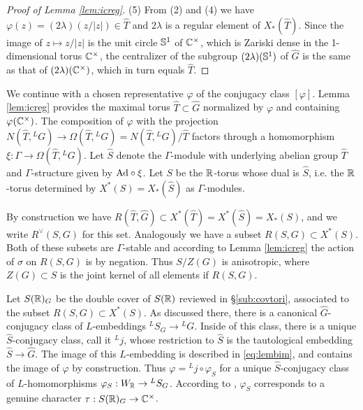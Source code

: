 \documentclass{article}
\theoremstyle{definition}
\numberwithin{equation}{section}
\renewcommand{\-}{\hyp{}}
\begin{document}
\begin{proof}[Proof of Lemma \ref{lem:icreg}]
(5) From (2) and (4) we have $\varphi(z)=(2\lambda)(z/|z|) \in \hat T$ and $2\lambda$ is a regular element of $X_*(\hat T)$. Since the image of $z \mapsto z/|z|$ is the unit circle $\mathbb{S}^1$ of $\mathbb{C}^\times$, which is Zariski dense in the 1-dimensional torus $\mathbb{C}^\times$, the centralizer of the subgroup $(2\lambda)(\mathbb{S}^1)$ of $\hat G$ is the same as that of $(2\lambda)(\mathbb{C}^\times)$, which in turn equals $\hat T$.
\end{proof}

We continue with a chosen representative $\varphi$ of the conjugacy class $[\varphi]$. Lemma \ref{lem:icreg} provides the maximal torus $\hat T \subset \hat G$ normalized by $\varphi$ and containing $\varphi(\mathbb{C}^\times)$.
%
%
The composition of $\varphi$ with the projection $N(\hat T,{^LG}) \to \Omega(\hat T,{^LG})=N(\hat T,{^LG})/\hat T$ factors through a homomorphism $\xi : \Gamma \to \Omega(\hat T,{^LG})$. Let $\hat S$ denote the $\Gamma$-module with underlying abelian group $\hat T$ and $\Gamma$-structure given by $\textrm{Ad}\circ\xi$. Let $S$ be the $\mathbb{R}$-torus whose dual is $\hat S$, i.e. the $\mathbb{R}$-torus determined by $X^*(S)=X_*(\hat S)$ as $\Gamma$-modules.


By construction we have $R(\hat T,\hat G) \subset X^*(\hat T)=X^*(\hat S)=X_*(S)$, and we write $R^\vee(S,G)$ for this set. Analogously we have a subset $R(S,G) \subset X^*(S)$. Both of these subsets are $\Gamma$-stable and according to Lemma \ref{lem:icreg} the action of $\sigma$ on $R(S,G)$ is by negation. Thus $S/Z(G)$ is anisotropic, where $Z(G) \subset S$ is the joint kernel of all elements if $R(S,G)$.

Let $S(\mathbb{R})_G$ be the double cover of $S(\mathbb{R})$ reviewed in \S\ref{sub:covtori}, associated to the subset $R(S,G) \subset X^*(S)$. As discussed there, there is a canonical $\hat G$-conjugacy class of $L$\-embeddings $^LS_G \to {^LG}$. Inside of this class, there is a unique $\hat S$-conjugacy class, call it $^Lj$, whose restriction to $\hat S$ is the tautological embedding $\hat S \to \hat G$. The image of this $L$\-embedding is described in \eqref{eq:lembim}, and contains the image of $\varphi$ by construction. Thus $\varphi = {^Lj}\circ\varphi_S$ for a unique $\hat S$-conjugacy class of $L$\-homomorphisms $\varphi_S : W_{\mathbb{R}} \to {^LS_G}$. According to \cite[Theorem 3.15]{KalDC}, $\varphi_S$ corresponds to a genuine character $\tau : S(\mathbb{R})_G \to \mathbb{C}^\times$.
\end{document}
